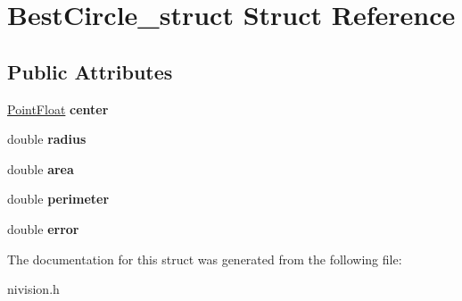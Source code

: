 \hypertarget{structBestCircle__struct}{
\section{BestCircle\_\-struct Struct Reference}
\label{structBestCircle__struct}
}
\subsection*{Public Attributes}
\begin{DoxyCompactItemize}
\item 
\hypertarget{structBestCircle__struct_a36a9e0f07cf600ccb57bb15657012fa4}{
\hyperlink{structPointFloat__struct}{PointFloat} {\bfseries center}}
\label{structBestCircle__struct_a36a9e0f07cf600ccb57bb15657012fa4}

\item 
\hypertarget{structBestCircle__struct_a947597e94aac3917ebd8a64faa31f806}{
double {\bfseries radius}}
\label{structBestCircle__struct_a947597e94aac3917ebd8a64faa31f806}

\item 
\hypertarget{structBestCircle__struct_a2d90442b14fd7c0a40b6fe18a5803e57}{
double {\bfseries area}}
\label{structBestCircle__struct_a2d90442b14fd7c0a40b6fe18a5803e57}

\item 
\hypertarget{structBestCircle__struct_a51fd331f9844e9345a0c91e4bad15d87}{
double {\bfseries perimeter}}
\label{structBestCircle__struct_a51fd331f9844e9345a0c91e4bad15d87}

\item 
\hypertarget{structBestCircle__struct_a17c691fd999fd990c3f5c03a9315a699}{
double {\bfseries error}}
\label{structBestCircle__struct_a17c691fd999fd990c3f5c03a9315a699}

\end{DoxyCompactItemize}


The documentation for this struct was generated from the following file:\begin{DoxyCompactItemize}
\item 
nivision.h\end{DoxyCompactItemize}
